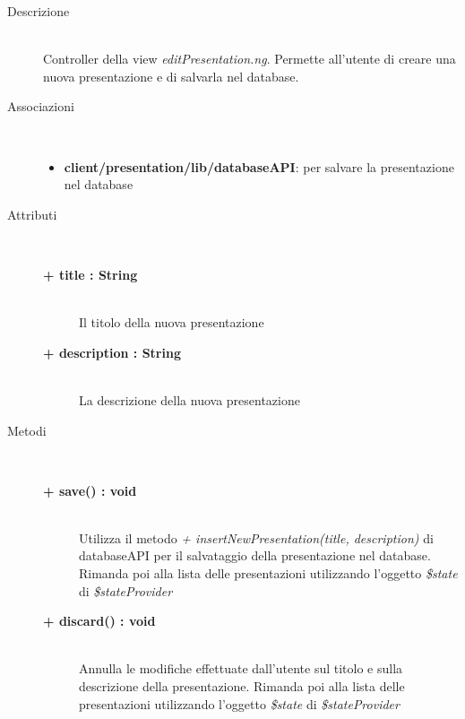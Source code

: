 \begin{description}
\item[Descrizione] \hfill \\
	Controller della view \textit{editPresentation.ng}. Permette all'utente di creare una nuova presentazione e di salvarla nel database.
	

\item[Associazioni] \hfill \\
	\begin{itemize}
		\item \textbf{client/presentation/lib/databaseAPI}: per salvare la presentazione nel database
	\end{itemize}

	
\item[Attributi] \hfill \\
	\begin{description}
		\item[\textbf{+ title : String			}] \hfill \\
		Il titolo della nuova presentazione
		\item[\textbf{+ description : String			}] \hfill \\	
		La descrizione della nuova presentazione
	\end{description}
	
	
\item[Metodi] \hfill \\

	\begin{description}
		\item[\textbf{\color{blue}+ save() : void			}] \hfill \\
			Utilizza il metodo \textit{+ insertNewPresentation(title, description)} di databaseAPI per il salvataggio della presentazione nel database. Rimanda poi alla lista delle presentazioni utilizzando l'oggetto \textit{\$state} di \textit{\$stateProvider}
	\end{description}
	
	\begin{description}
		\item[\textbf{\color{blue}+ discard() : void			}] \hfill \\
			Annulla le modifiche effettuate dall'utente sul titolo e sulla descrizione della presentazione. Rimanda poi alla lista delle presentazioni utilizzando l'oggetto \textit{\$state} di \textit{\$stateProvider}
	\end{description}
	
	
	
\end{description}




